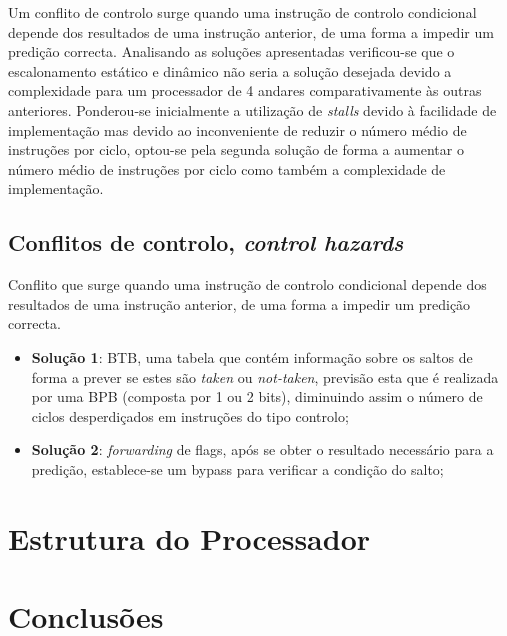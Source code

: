 \documentclass[11pt]{article}
\numberwithin{equation}{section}
\begin{document}
Um conflito de controlo surge quando uma instrução de controlo condicional depende dos resultados de uma instrução anterior, de uma forma a impedir um predição correcta. 
\vspace{-2.5mm}
Analisando as soluções apresentadas verificou-se que o escalonamento estático e dinâmico não seria a solução desejada devido a complexidade para um processador de 4 andares comparativamente às outras anteriores. Ponderou-se inicialmente a utilização de \textit{stalls} devido à facilidade de implementação mas devido ao inconveniente de reduzir o número médio de instruções por ciclo, optou-se pela segunda solução de forma a aumentar o número médio de instruções por ciclo como também a complexidade de implementação.

\subsection{Conflitos de controlo, \textit{control hazards}}
Conflito que surge quando uma instrução de controlo condicional depende dos	resultados de uma instrução anterior, de uma forma a impedir um predição correcta.

\begin{itemize}
	\item \textbf{Solução 1}: BTB, uma tabela que contém informação sobre os saltos de forma a prever se estes são \textit{taken} ou \textit{not-taken}, previsão esta que é realizada por uma BPB (composta por 1 ou 2 bits), diminuindo assim o número de ciclos desperdiçados em instruções do tipo controlo;
	\item \textbf{Solução 2}: \textit{forwarding} de flags, após se obter o resultado necessário para a predição, establece-se um bypass para verificar a condição do salto;
	\vspace{-2.5mm}
\end{itemize}


\section{Estrutura do Processador}

\section{Conclusões}

\pagebreak

\listoftodos
\end{document}
